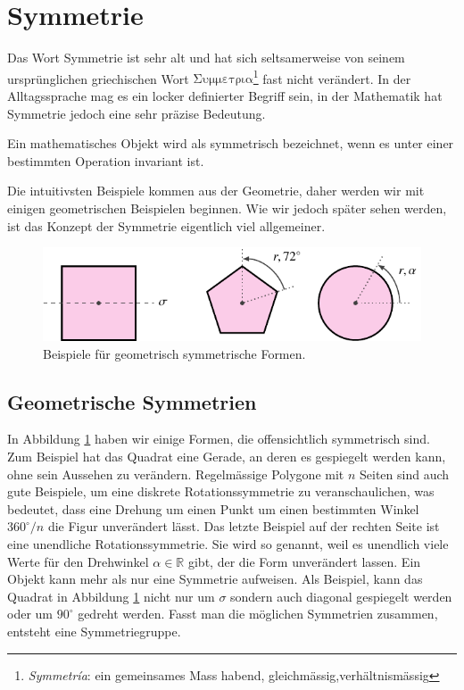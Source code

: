 \section{Symmetrie}
Das Wort Symmetrie ist sehr alt und hat sich seltsamerweise von seinem
ursprünglichen griechischen Wort \(\mathrm{\Sigma\upsilon\mu\mu\varepsilon\tau\rho\iota\alpha}\)\footnote{\emph{Symmetr\'ia}: ein gemeinsames Mass habend, gleichmässig,verhältnismässig} fast nicht verändert.
In der Alltagssprache mag es ein locker definierter Begriff sein, in der Mathematik hat Symmetrie jedoch eine sehr präzise Bedeutung.
\begin{definition}[Symmetrie]
  Ein mathematisches Objekt wird als symmetrisch bezeichnet, wenn es unter einer bestimmten Operation invariant ist.
\end{definition}
Die intuitivsten Beispiele kommen aus der Geometrie, daher werden wir mit einigen geometrischen Beispielen beginnen.
Wie wir jedoch später sehen werden, ist das Konzept der Symmetrie eigentlich viel allgemeiner.

\begin{figure}
  \centering
  \includegraphics{papers/punktgruppen/figures/symmetric-shapes}
  \caption{
    Beispiele für geometrisch symmetrische Formen.
    \label{fig:punktgruppen:geometry-example}
  }
\end{figure}

\subsection{Geometrische Symmetrien}

In Abbildung \ref{fig:punktgruppen:geometry-example} haben wir einige Formen, die offensichtlich symmetrisch sind.
Zum Beispiel hat das Quadrat eine Gerade, an deren es gespiegelt werden kann, ohne sein Aussehen zu verändern.
Regelmässige Polygone mit \(n\) Seiten sind auch gute Beispiele, um eine diskrete Rotationssymmetrie zu veranschaulichen, was bedeutet, dass eine Drehung um einen Punkt um einen bestimmten Winkel \(360^\circ/n\) die Figur unverändert lässt.
Das letzte Beispiel auf der rechten Seite ist eine unendliche Rotationssymmetrie. Sie wird so genannt, weil es unendlich viele Werte für den Drehwinkel \(\alpha \in \mathbb{R}\) gibt, der die Form unverändert lassen.
Ein Objekt kann mehr als nur eine Symmetrie aufweisen.
Als Beispiel, kann das Quadrat in Abbildung \ref{fig:punktgruppen:geometry-example} nicht nur um \(\sigma\) sondern auch diagonal gespiegelt werden oder um \(90^\circ\) gedreht werden.
Fasst man die möglichen Symmetrien zusammen, entsteht eine Symmetriegruppe.

